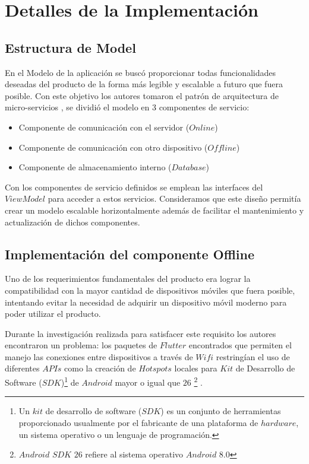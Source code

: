 \section{Detalles de la Implementación}
\label{chapter:implementation}

\subsection{Estructura de Model}

En el Modelo de la aplicación se buscó proporcionar todas funcionalidades deseadas del producto de la forma más legible y escalable a futuro que fuera posible. Con este objetivo los autores tomaron el patrón de arquitectura de micro-servicios , se dividió el modelo en 3 componentes de servicio: 

\begin{itemize}
\item Componente de comunicación con el servidor ($Online$)
\item Componente de comunicación con otro dispositivo ($Offline$)
\item Componente de almacenamiento interno ($Database$)
\end{itemize}

Con los componentes de servicio definidos se emplean las interfaces del $ViewModel$ para acceder a estos servicios. Consideramos que este diseño permitía crear un modelo escalable horizontalmente además de facilitar el mantenimiento y actualización de dichos componentes.

\subsection{Implementación del componente Offline}

Uno de los requerimientos fundamentales del producto era lograr la compatibilidad con la mayor cantidad de dispositivos móviles que fuera posible, intentando evitar la necesidad de adquirir un dispositivo móvil moderno para poder utilizar el producto.

Durante la investigación realizada para satisfacer este requisito los autores encontraron un problema: los paquetes de $Flutter$ encontrados que permiten el manejo las conexiones entre dispositivos a través de $Wifi$ restringían el uso de diferentes $APIs$ como la creación de $Hotspots$ locales para $Kit$ de Desarrollo de Software ($SDK$)\footnote{Un $kit$ de desarrollo de software ($SDK$) es un conjunto de herramientas proporcionado usualmente por el fabricante de una plataforma de $hardware$, un sistema operativo o un lenguaje de programación.} de $Android$ mayor o igual que $26$ \footnote{$Android$ $SDK$ $26$ refiere al sistema operativo $Android$ $8.0$} .

